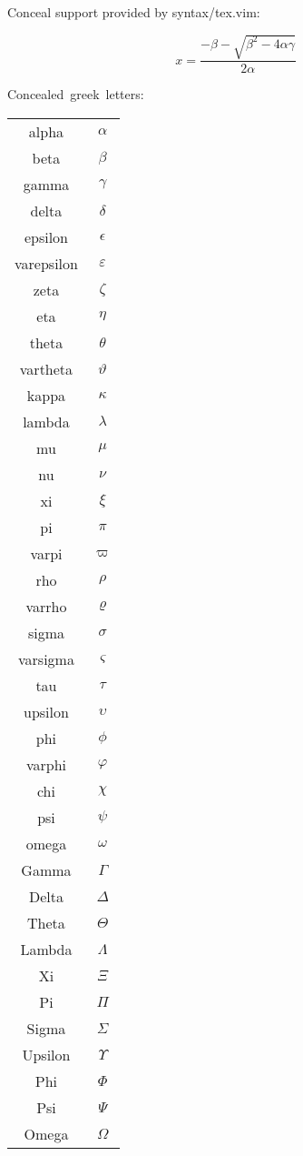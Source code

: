 \documentclass{article}
\begin{document}
Conceal support provided by syntax/tex.vim:

\[
x=\frac{-\beta - \sqrt{\beta^2-4\alpha\gamma}}%
       {2\alpha}%
\]

Concealed greek letters:

\begin{tabular}{c|c}%
    alpha & \(\alpha\)\\
    beta & \(\beta\)\\
    gamma & \(\gamma\)\\
    delta & \(\delta\)\\
    epsilon & \(\epsilon\)\\
    varepsilon & \(\varepsilon\)\\
    zeta & \(\zeta\)\\
    eta & \(\eta\)\\
    theta & \(\theta\)\\
    vartheta & \(\vartheta\)\\
    kappa & \(\kappa\)\\
    lambda & \(\lambda\)\\
    mu & \(\mu\)\\
    nu & \(\nu\)\\
    xi & \(\xi\)\\
    pi & \(\pi\)\\
    varpi & \(\varpi\)\\
    rho & \(\rho\)\\
    varrho & \(\varrho\)\\
    sigma & \(\sigma\)\\
    varsigma & \(\varsigma\)\\
    tau & \(\tau\)\\
    upsilon & \(\upsilon\)\\
    phi & \(\phi\)\\
    varphi & \(\varphi\)\\
    chi & \(\chi\)\\
    psi & \(\psi\)\\
    omega & \(\omega\)\\
    Gamma & \(\Gamma\)\\
    Delta & \(\Delta\)\\
    Theta & \(\Theta\)\\
    Lambda & \(\Lambda\)\\
    Xi & \(\Xi\)\\
    Pi & \(\Pi\)\\
    Sigma & \(\Sigma\)\\
    Upsilon & \(\Upsilon\)\\
    Phi & \(\Phi\)\\
    Psi & \(\Psi\)\\
    Omega & \(\Omega\)\\
\end{tabular}
\end{document}
